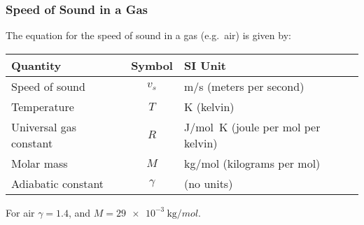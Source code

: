 \documentclass[12pt,aspectratio=169]{beamer}
\newcommand{\eq}[2]{\vspace{#1}{\Large\begin{displaymath}#2\end{displaymath}}}
\begin{document}
\begin{frame}
  \frametitle{Speed of Sound in a Gas}
  The equation for the speed of sound in a gas (e.g.\ air) is given by:

  \eq{-.4in}{
    \boxed{v_s=\sqrt{\frac{\gamma RT}{M}}}
  }
  \begin{center}
    \begin{tabular}{l|c|l}
      \rowcolor{pink}
      \textbf{Quantity} & \textbf{Symbol} & \textbf{SI Unit} \\ \hline
      Speed of sound     & $v_s$ & \si{m/s} (meters per second) \\      
      Temperature        & $T$  & \si{\kelvin} (kelvin)\\
      Universal gas constant & $R$  & \si{J/mol.K} (joule per mol per kelvin)\\
      Molar mass & $M$  & \si{\kilo\gram/mol} (kilograms per mol)\\
      Adiabatic constant  & $\gamma$  & (no units)
    \end{tabular}
  \end{center}
  For air $\gamma=1.4$, and $M=\SI{29e-3}{\kilo\gram/mol}$.
\end{frame}
\end{document}
